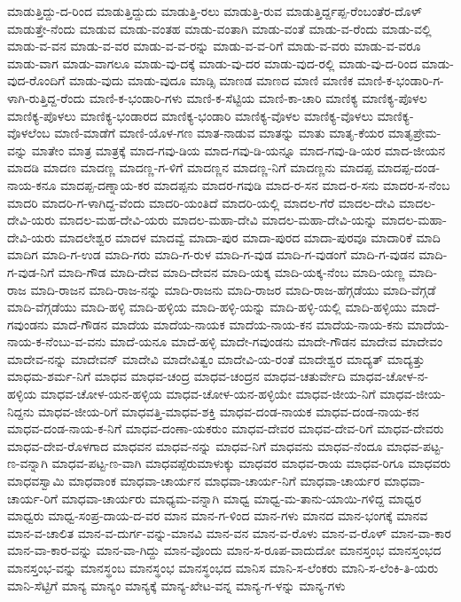 ಮಾಡುತ್ತಿದ್ದು-ದ-ರಿಂದ
ಮಾಡುತ್ತಿದ್ದುದು
ಮಾಡುತ್ತಿ-ರಲು
ಮಾಡುತ್ತಿ-ರುವ
ಮಾಡುತ್ತಿರ್ದ್ದಪ್ಪ-ರೆಂಬಂತೆರ-ದೊಳ್
ಮಾಡುತ್ತೇ-ನೆಂದು
ಮಾಡುವ
ಮಾಡು-ವಂತಹ
ಮಾಡು-ವಂತಾಗಿ
ಮಾಡು-ವಂತೆ
ಮಾಡು-ವ-ರೆಂದು
ಮಾಡು-ವಲ್ಲಿ
ಮಾಡು-ವ-ವನ
ಮಾಡು-ವ-ವರ
ಮಾಡು-ವ-ವ-ರನ್ನು
ಮಾಡು-ವ-ವ-ರಿಗೆ
ಮಾಡು-ವ-ವರು
ಮಾಡು-ವ-ವರೂ
ಮಾಡು-ವಾಗ
ಮಾಡು-ವಾಗಲೂ
ಮಾಡು-ವು-ದಕ್ಕೆ
ಮಾಡು-ವು-ದರ
ಮಾಡು-ವುದ-ರಲ್ಲಿ
ಮಾಡು-ವು-ದ-ರಿಂದ
ಮಾಡು-ವುದ-ರೊಂದಿಗೆ
ಮಾಡು-ವುದು
ಮಾಡು-ವುದೂ
ಮಾಡ್ಸಿ
ಮಾಣಡ
ಮಾಣದ
ಮಾಣಿ
ಮಾಣಿಕ
ಮಾಣಿ-ಕ-ಭಂಡಾರಿ-ಗ-ಳಾಗಿ-ರುತ್ತಿದ್ದ-ರೆಂದು
ಮಾಣಿ-ಕ-ಭಂಡಾರಿ-ಗಳು
ಮಾಣಿ-ಕ-ಸೆಟ್ಟಿಯ
ಮಾಣಿ-ಕಾ-ಚಾರಿ
ಮಾಣಿಕ್ಯ
ಮಾಣಿಕ್ಯ-ಪೊಳಲ
ಮಾಣಿಕ್ಯ-ಪೊಳಲು
ಮಾಣಿಕ್ಯ-ಭಂಡಾರದ
ಮಾಣಿಕ್ಯ-ಭಂಡಾರಿ
ಮಾಣಿಕ್ಯ-ವೊಳಲ
ಮಾಣಿಕ್ಯ-ವೊಳಲು
ಮಾಣಿಕ್ಯ-ವೊಳಲೆಂಬ
ಮಾಣಿ-ಮಾಡೆಗೆ
ಮಾಣಿ-ಯೊಳ-ಗಣ
ಮಾತ-ನಾಡುವ
ಮಾತನ್ನು
ಮಾತು
ಮಾತೃ-ಕೆಯರ
ಮಾತೃಪ್ರೇಮ-ವನ್ನು
ಮಾತೇಂ
ಮಾತ್ರ
ಮಾತ್ರಕ್ಕೆ
ಮಾದ-ಗವು-ಡಿಯ
ಮಾದ-ಗವು-ಡಿ-ಯನ್ನೂ
ಮಾದ-ಗವು-ಡಿ-ಯರ
ಮಾದ-ಜೀಯನ
ಮಾದಡಿ
ಮಾದಣ
ಮಾದಣ್ಣ
ಮಾದಣ್ಣ-ಗ-ಳಿಗೆ
ಮಾದಣ್ಣನ
ಮಾದಣ್ಣ-ನಿಗೆ
ಮಾದಣ್ಣನು
ಮಾದಪ್ಪ
ಮಾದಪ್ಪ-ದಂಡ-ನಾಯ-ಕನೂ
ಮಾದಪ್ಪ-ದಣ್ನಾಯ-ಕರ
ಮಾದಪ್ಪನು
ಮಾದರ-ಗವುಡಿ
ಮಾದ-ರ-ಸನ
ಮಾದ-ರ-ಸನು
ಮಾದರ-ಸ-ನೆಂಬ
ಮಾದರಿ
ಮಾದರಿ-ಗ-ಳಾಗಿದ್ದ-ವೆಂದು
ಮಾದರಿ-ಯಂತಿದೆ
ಮಾದರಿ-ಯಲ್ಲಿ
ಮಾದಲ-ಗೆರೆ
ಮಾದಲ-ದೇವಿ
ಮಾದಲ-ದೇವಿ-ಯರು
ಮಾದಲ-ಮಹ-ದೇವಿ-ಯರು
ಮಾದಲ-ಮಹಾ-ದೇವಿ
ಮಾದಲ-ಮಹಾ-ದೇವಿ-ಯನ್ನು
ಮಾದಲ-ಮಹಾ-ದೇವಿ-ಯರು
ಮಾದಲೇಶ್ವರ
ಮಾದಳ
ಮಾದವ್ವೆ
ಮಾದಾ-ಪುರ
ಮಾದಾ-ಪುರದ
ಮಾದಾ-ಪುರವೂ
ಮಾದಾರಿಕೆ
ಮಾದಿ
ಮಾದಿಗ
ಮಾದಿ-ಗ-ಉಡ
ಮಾದಿ-ಗರು
ಮಾದಿ-ಗ-ರುಳ
ಮಾದಿ-ಗ-ವುಡ
ಮಾದಿ-ಗ-ವುಡಂಗೆ
ಮಾದಿ-ಗ-ವುಡನ
ಮಾದಿ-ಗ-ವುಡ-ನಿಗೆ
ಮಾದಿ-ಗೌಡ
ಮಾದಿ-ದೇವ
ಮಾದಿ-ದೇವನ
ಮಾದಿ-ಯಕ್ಕ
ಮಾದಿ-ಯಕ್ಕ-ನೆಂಬ
ಮಾದಿ-ಯಣ್ಣ
ಮಾದಿ-ರಾಜ
ಮಾದಿ-ರಾಜನ
ಮಾದಿ-ರಾಜ-ನನ್ನು
ಮಾದಿ-ರಾಜನು
ಮಾದಿ-ರಾಜರ
ಮಾದಿ-ರಾಜ-ಹೆಗ್ಗಡೆಯು
ಮಾದಿ-ವೆಗ್ಗಡೆ
ಮಾದಿ-ವೆಗ್ಗಡೆಯು
ಮಾದಿ-ಹಳ್ಳಿ
ಮಾದಿ-ಹಳ್ಳಿಯ
ಮಾದಿ-ಹಳ್ಳಿ-ಯನ್ನು
ಮಾದಿ-ಹಳ್ಳಿ-ಯಲ್ಲಿ
ಮಾದಿ-ಹಳ್ಳಿಯು
ಮಾದೆ-ಗವುಂಡನು
ಮಾದೆ-ಗೌಡನ
ಮಾದೆಯ
ಮಾದೆಯ-ನಾಯಕ
ಮಾದೆಯ-ನಾಯ-ಕನ
ಮಾದೆಯ-ನಾಯ-ಕನು
ಮಾದೆಯ-ನಾಯ-ಕ-ನೆಂಬು-ವ-ವನು
ಮಾದೆ-ಯನೂ
ಮಾದೆ-ಹಳ್ಳಿ
ಮಾದೇ-ಗವುಂಡನು
ಮಾದೇ-ಗೌಡನ
ಮಾದೇವ
ಮಾದೇವಂ
ಮಾದೇವ-ನನ್ನು
ಮಾದೇವನ್
ಮಾದೇವಿ
ಮಾದೇವಿತ್ವಂ
ಮಾದೇವಿ-ಯ-ರಂತೆ
ಮಾದೇಶ್ವರ
ಮಾದ್ಯತ್
ಮಾದ್ಯತ್ತು
ಮಾಧಮ-ಶರ್ಮ-ನಿಗೆ
ಮಾಧವ
ಮಾಧವ-ಚಂದ್ರ
ಮಾಧವ-ಚಂದ್ರನ
ಮಾಧವ-ಚತುರ್ವೇದಿ
ಮಾಧವ-ಚೋಳ-ನ-ಹಳ್ಳಿಯ
ಮಾಧವ-ಚೋಳ-ಯನ-ಹಳ್ಳಿಯ
ಮಾಧವ-ಚೋಳ-ಯನ-ಹಳ್ಳಿಯೇ
ಮಾಧವ-ಜೀಯ-ನಿಗೆ
ಮಾಧವ-ಜೀಯ-ನಿದ್ದನು
ಮಾಧವ-ಜೀಯ-ರಿಗೆ
ಮಾಧವತ್ತಿ-ಮಾಧವ-ಶಕ್ತಿ
ಮಾಧವ-ದಂಡ-ನಾಯಕ
ಮಾಧವ-ದಂಡ-ನಾಯ-ಕನ
ಮಾಧವ-ದಂಡ-ನಾಯ-ಕ-ನಿಗೆ
ಮಾಧವ-ದಂಣಾ-ಯಕರುಂ
ಮಾಧವ-ದೇವರ
ಮಾಧವ-ದೇವ-ರಿಗೆ
ಮಾಧವ-ದೇವರು
ಮಾಧವ-ದೇವ-ರೊಳಗಾದ
ಮಾಧವನ
ಮಾಧವ-ನನ್ನು
ಮಾಧವ-ನಿಗೆ
ಮಾಧವನು
ಮಾಧವ-ನೆಂದೂ
ಮಾಧವ-ಪಟ್ಟ-ಣ-ವನ್ನಾಗಿ
ಮಾಧವ-ಪಟ್ಟ-ಣ-ವಾಗಿ
ಮಾಧವಪ್ಪೆರುಮಾಳುಕ್ಕು
ಮಾಧವರ
ಮಾಧವ-ರಾಯ
ಮಾಧವ-ರಿಗೂ
ಮಾಧವರು
ಮಾಧವಸ್ವಾಮಿ
ಮಾಧವಾಂಕ
ಮಾಧವಾ-ಚಾರ್ಯನ
ಮಾಧವಾ-ಚಾರ್ಯ-ನಿಗೆ
ಮಾಧವಾ-ಚಾರ್ಯರ
ಮಾಧವಾ-ಚಾರ್ಯ-ರಿಗೆ
ಮಾಧವಾ-ಚಾರ್ಯರು
ಮಾಧ್ಯಮ-ವನ್ನಾಗಿ
ಮಾಧ್ವ
ಮಾಧ್ವ-ಮ-ತಾನು-ಯಾಯಿ-ಗಳಿದ್ದ
ಮಾಧ್ವರ
ಮಾಧ್ವರು
ಮಾಧ್ವ-ಸಂಪ್ರ-ದಾಯ-ದ-ವರ
ಮಾನ
ಮಾನ-ಗ-ಳಿಂದ
ಮಾನ-ಗಳು
ಮಾನದ
ಮಾನ-ಭಂಗಕ್ಕೆ
ಮಾನವ
ಮಾನ-ವ-ಚಾಲಿತ
ಮಾನ-ವ-ದುರ್ಗ-ವನ್ನು-ಮಾನವಿ
ಮಾನ-ವನ
ಮಾನ-ವ-ರೊಳು
ಮಾನ-ವ-ರೊಳ್
ಮಾನ-ವಾ-ಕಾರ
ಮಾನ-ವಾ-ಕಾರ-ವನ್ನು
ಮಾನ-ವಾ-ಗಿದ್ದು
ಮಾನ-ವೊಂದು
ಮಾನ-ಸ-ರೂಪ-ವಾದುದೋ
ಮಾನಸ್ತಂಭ
ಮಾನಸ್ತಂಭದ
ಮಾನಸ್ತಂಭ-ವನ್ನು
ಮಾನಸ್ಥಂಬ
ಮಾನಸ್ಥಂಭ
ಮಾನಸ್ಥಂಭದ
ಮಾನಿಸ
ಮಾನಿ-ಸ-ಲೆಂಕರು
ಮಾನಿ-ಸ-ಲೆಂಕಿ-ತಿ-ಯರು
ಮಾನಿ-ಸೆಟ್ಟಿಗೆ
ಮಾನ್ಯ
ಮಾನ್ಯಂ
ಮಾನ್ಯಕ್ಕೆ
ಮಾನ್ಯ-ಖೇಟ-ವನ್ನ
ಮಾನ್ಯ-ಗ-ಳನ್ನು
ಮಾನ್ಯ-ಗಳು
